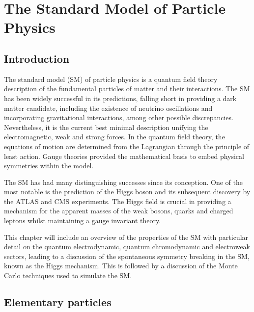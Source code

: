 \chapter{The Standard Model of Particle Physics}
\label{chap:theory}


\section{Introduction}

The standard model (SM) of particle physics is a quantum field theory description of the fundamental particles of matter and their interactions. The SM has been widely successful in its predictions, falling short in providing a dark matter candidate, including the existence of neutrino oscillations and incorporating gravitational interactions, among other possible discrepancies.  Nevertheless, it is the current best minimal description unifying the electromagnetic, weak and strong forces. In the quantum field theory, the equations of motion are determined from the Lagrangian through the principle of least action. Gauge theories provided the mathematical basis to embed physical symmetries within the model.

The SM has had many distinguishing successes since its conception. One of the most notable is the prediction of the Higgs boson \cite{PhysRevLett.13.321,PhysRevLett.13.508,PhysRevLett.13.585} and its subsequent discovery by the ATLAS \cite{Aad:2012tfa} and CMS \cite{Chatrchyan:2012xdj} experiments. The Higgs field is crucial in providing a mechanism for the apparent masses of the weak bosons, quarks and charged leptons whilst maintaining a gauge invariant theory.

This chapter will include an overview of the properties of the SM with particular detail on the quantum electrodynamic, quantum chromodynamic and electroweak sectors, leading to a discussion of the spontaneous symmetry breaking in the SM, known as the Higgs mechanism. This is followed by a discussion of the Monte Carlo techniques used to simulate the SM.


\section{Elementary particles}

